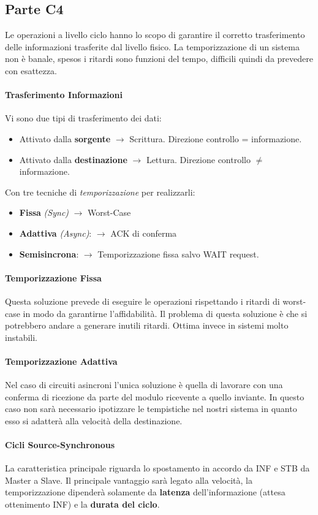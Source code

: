 \documentclass[12pt]{article}
\begin{document}
\subsection{Parte C4}\label{c4}
Le operazioni a livello ciclo hanno lo scopo di garantire il corretto trasferimento delle informazioni trasferite dal livello fisico. La temporizzazione di un sistema non è banale, spesos i ritardi sono funzioni del tempo, difficili quindi da prevedere con esattezza.
\paragraph{Trasferimento Informazioni} Vi sono due tipi di trasferimento dei dati:
\begin{itemize}
  \item Attivato dalla \textbf{sorgente} $\rightarrow$ Scrittura. Direzione controllo = informazione.
  \item Attivato dalla \textbf{destinazione} $\rightarrow$ Lettura. Direzione controllo  $\neq$ informazione.
\end{itemize}
Con tre tecniche di \textit{temporizzazione} per realizzarli:
\begin{itemize}
  \item \textbf{Fissa} \textit{(Sync)} $\rightarrow$ Worst-Case
  \item \textbf{Adattiva} \textit{(Async)}: $\rightarrow$ ACK di conferma
  \item \textbf{Semisincrona}: $\rightarrow$ Temporizzazione fissa salvo WAIT request.
\end{itemize}
\paragraph{Temporizzazione Fissa} Questa soluzione prevede di eseguire le operazioni rispettando i ritardi di worst-case in modo da garantirne l'affidabilità. Il problema di questa soluzione è che si potrebbero andare a generare inutili ritardi. Ottima invece in sistemi molto instabili.
\paragraph{Temporizzazione Adattiva} Nel caso di circuiti asincroni l'unica soluzione è quella di lavorare con una conferma di ricezione da parte del modulo ricevente a quello inviante. In questo caso non sarà necessario ipotizzare le tempistiche nel nostri sistema in quanto esso si adatterà alla velocità della destinazione.
\paragraph{Cicli Source-Synchronous} La caratteristica principale riguarda lo spostamento in accordo da INF e STB da Master a Slave. Il principale vantaggio sarà legato alla velocità, la temporizzazione dipenderà solamente da \textbf{latenza} dell'informazione (attesa ottenimento INF) e la \textbf{durata del ciclo}.
\end{document}
